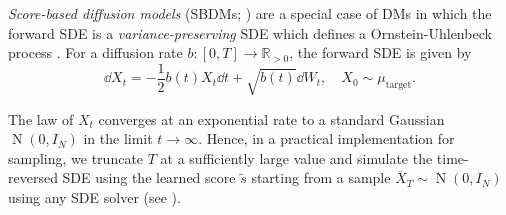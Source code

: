 %

\textit{Score-based diffusion models} (SBDMs; \citealp[Equation 11]{song2021scorebasedgenerativemodelingstochastic}) are a special case of DMs in which the forward SDE is a \textit{variance-preserving} SDE which defines a Ornstein-Uhlenbeck process \citep{uhlenbeck1930theory}. For a diffusion rate \(b : [0, T] \to \mathbb{R}_{>0}\), the forward SDE is given by
\[
  \dd{X_{t}} = - \frac{1}{2} b(t) X_{t} \dd{t} + \sqrt{b(t)} \dd{W_{t}}, \quad X_{0} \sim \mu_{\text{target}}.
\]

The law of \(X_{t}\) converges at an exponential rate to a standard Gaussian \(\operatorname{N}(0, I_{N})\) in the limit \(t \to \infty\). Hence, in a practical implementation for sampling, we truncate \(T\) at a sufficiently large value and simulate the time-reversed SDE using the learned score \(\widetilde{s}\) starting from a sample \(\overline{X}_{T} \sim \operatorname{N}(0, I_{N})\) using any SDE solver (see \citealp{karras2022elucidating}).


